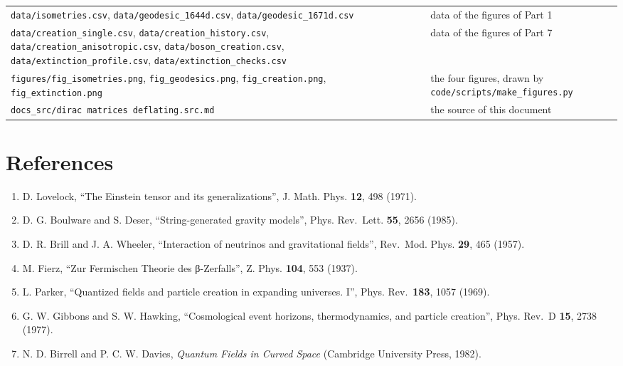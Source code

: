 \documentclass[
  10pt,
]{article}
\providecommand{\tightlist}{%
  \setlength{\itemsep}{0pt}\setlength{\parskip}{0pt}}
\begin{document}
\begin{longtable}[]{@{}
  >{\raggedright\arraybackslash}p{}
  >{\raggedright\arraybackslash}p{}@{}}
\texttt{data/isometries.csv}, \texttt{data/geodesic\_1644d.csv},
\texttt{data/geodesic\_1671d.csv} & data of the figures of Part 1 \\
\texttt{data/creation\_single.csv}, \texttt{data/creation\_history.csv},
\texttt{data/creation\_anisotropic.csv},
\texttt{data/boson\_creation.csv},
\texttt{data/extinction\_profile.csv},
\texttt{data/extinction\_checks.csv} & data of the figures of Part 7 \\
\texttt{figures/fig\_isometries.png}, \texttt{fig\_geodesics.png},
\texttt{fig\_creation.png}, \texttt{fig\_extinction.png} & the four
figures, drawn by \texttt{code/scripts/make\_figures.py} \\
\texttt{docs\_src/dirac\ matrices\ deflating.src.md} & the source of
this document \\
\end{longtable}

\hypertarget{references}{%
\section{References}\label{references}}

\begin{enumerate}
\def\labelenumi{\arabic{enumi}.}
\tightlist
\item
  D. Lovelock, ``The Einstein tensor and its generalizations'', J. Math.
  Phys. \textbf{12}, 498 (1971).
\item
  D. G. Boulware and S. Deser, ``String-generated gravity models'',
  Phys. Rev.~Lett. \textbf{55}, 2656 (1985).
\item
  D. R. Brill and J. A. Wheeler, ``Interaction of neutrinos and
  gravitational fields'', Rev.~Mod. Phys. \textbf{29}, 465 (1957).
\item
  M. Fierz, ``Zur Fermischen Theorie des β-Zerfalls'', Z. Phys.
  \textbf{104}, 553 (1937).
\item
  L. Parker, ``Quantized fields and particle creation in expanding
  universes. I'', Phys. Rev.~\textbf{183}, 1057 (1969).
\item
  G. W. Gibbons and S. W. Hawking, ``Cosmological event horizons,
  thermodynamics, and particle creation'', Phys. Rev.~D \textbf{15},
  2738 (1977).
\item
  N. D. Birrell and P. C. W. Davies, \emph{Quantum Fields in Curved
  Space} (Cambridge University Press, 1982).
\end{enumerate}
\end{document}
